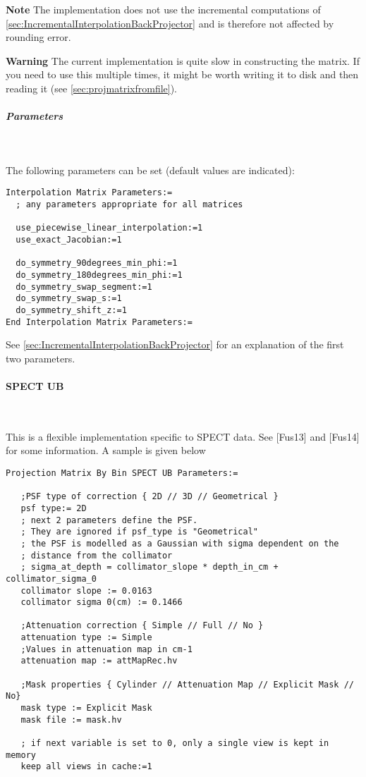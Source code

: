 \documentclass{article}
\newcommand{\subsubsubsection}[1]{\paragraph{#1}\mbox{} \\}
\newcommand{\subsubsubsubsection}[1]{\subparagraph{#1} \mbox{} \\}
\begin{document}
{\textbf{Note} The implementation does not use the incremental computations of 
\ref{sec:IncrementalInterpolationBackProjector} and is therefore not affected 
by rounding error.

\textbf{Warning} The current implementation is quite slow in constructing the matrix.
If you need to use this multiple times, it might be worth writing it to disk and
then reading it (see \ref{sec:projmatrixfromfile}).

{ \subsubsubsubsection{Parameters}
}
The following parameters can be set (default values are indicated):
\begin{verbatim}
Interpolation Matrix Parameters:=
  ; any parameters appropriate for all matrices

  use_piecewise_linear_interpolation:=1
  use_exact_Jacobian:=1

  do_symmetry_90degrees_min_phi:=1
  do_symmetry_180degrees_min_phi:=1
  do_symmetry_swap_segment:=1
  do_symmetry_swap_s:=1
  do_symmetry_shift_z:=1
End Interpolation Matrix Parameters:=
\end{verbatim}

See \ref{sec:IncrementalInterpolationBackProjector} for an explanation 
of the first two parameters.

{ \subsubsubsection{SPECT UB}
}
\label{sec:projmatrixSPECTUB}
This is a flexible implementation specific to SPECT data. See [Fus13] and [Fus14] for some information.
A sample is given below

\begin{verbatim}
Projection Matrix By Bin SPECT UB Parameters:=

   ;PSF type of correction { 2D // 3D // Geometrical }
   psf type:= 2D
   ; next 2 parameters define the PSF. 
   ; They are ignored if psf_type is "Geometrical"
   ; the PSF is modelled as a Gaussian with sigma dependent on the 
   ; distance from the collimator
   ; sigma_at_depth = collimator_slope * depth_in_cm + collimator_sigma_0
   collimator slope := 0.0163
   collimator sigma 0(cm) := 0.1466

   ;Attenuation correction { Simple // Full // No }
   attenuation type := Simple
   ;Values in attenuation map in cm-1
   attenuation map := attMapRec.hv

   ;Mask properties { Cylinder // Attenuation Map // Explicit Mask // No}
   mask type := Explicit Mask
   mask file := mask.hv

   ; if next variable is set to 0, only a single view is kept in memory
   keep all views in cache:=1


\end{verbatim}}
\end{document}
